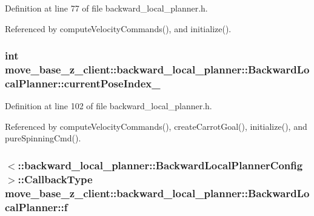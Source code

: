 Definition at line 77 of file backward\+\_\+local\+\_\+planner.\+h.



Referenced by compute\+Velocity\+Commands(), and initialize().

\subsubsection[{\texorpdfstring{current\+Pose\+Index\+\_\+}{currentPoseIndex_}}]{\setlength{\rightskip}{0pt plus 5cm}int move\+\_\+base\+\_\+z\+\_\+client\+::backward\+\_\+local\+\_\+planner\+::\+Backward\+Local\+Planner\+::current\+Pose\+Index\+\_\+\hspace{0.3cm}{\ttfamily [private]}}\hypertarget{classmove__base__z__client_1_1backward__local__planner_1_1BackwardLocalPlanner_af304b2e7cde744ad905a1ae7889102b6}{}\label{classmove__base__z__client_1_1backward__local__planner_1_1BackwardLocalPlanner_af304b2e7cde744ad905a1ae7889102b6}


Definition at line 102 of file backward\+\_\+local\+\_\+planner.\+h.



Referenced by compute\+Velocity\+Commands(), create\+Carrot\+Goal(), initialize(), and pure\+Spinning\+Cmd().

\subsubsection[{\texorpdfstring{f}{f}}]{$<$\+::backward\+\_\+local\+\_\+planner\+::\+Backward\+Local\+Planner\+Config$>$\+::Callback\+Type move\+\_\+base\+\_\+z\+\_\+client\+::backward\+\_\+local\+\_\+planner\+::\+Backward\+Local\+Planner\+::f\hspace{0.3cm}{\ttfamily [private]}}\hypertarget{classmove__base__z__client_1_1backward__local__planner_1_1BackwardLocalPlanner_a8851653bff38ab410bda8aca0ba32574}{}\label{classmove__base__z__client_1_1backward__local__planner_1_1BackwardLocalPlanner_a8851653bff38ab410bda8aca0ba32574}


